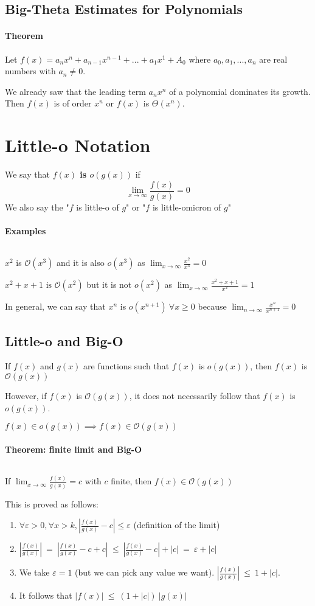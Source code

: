 \documentclass[10pt,a4paper]{book}
\begin{document}
\subsection{Big-Theta Estimates for Polynomials}
\paragraph*{Theorem}
Let $f(x)=a_nx^n+a_{n-1}x^{n-1}+...+a_1x^1+A_0$ where $a_0,a_1,...,a_n$ are real numbers with $a_n \neq 0$.\par
We already saw that the leading term $a_nx^n$ of a polynomial dominates its growth. Then $f(x)$ is of order $x^n$ or $f(x)$ is $\Theta (x^n)$.
\section{Little-o Notation}
We say that \textbf{$f(x)$ is $o (g(x))$} if \[ \lim_{x\to\infty} \frac{f(x)}{g(x)} = 0 \]
We also say the "$f$ is little-o of $g$" or "$f$ is little-omicron of $g$"
\paragraph*{Examples}
$\ $\par
$x^2$ is $\mathcal{O}(x^3)$ and it is also $o(x^3)$ as $\lim_{x\to \infty} \frac{x^2}{x^3} = 0$\par
$x^2+x+1\text{ is }\mathcal{O}(x^2)$ but it is not $o(x^2)$ as $\lim_{x\to \infty} \frac{x^2+x+1}{x^2} =1$\par 
In general, we can say that $x^n$ is $o(x^{n+1})\ \forall x \geq 0$ because $\lim_{n\to \infty} \frac{x^n}{x^{n+1}} =0$
\subsection{Little-o and Big-O}
If $f(x)$ and $g(x)$ are functions such that $f(x)$ is $o(g(x))$, then $f(x)$ is $\mathcal{O}(g(x))$\par 
However, if $f(x)$ is $\mathcal{O}(g(x))$, it does not necessarily follow that $f(x)$ is $o(g(x))$.\par 
$f(x) \in o(g(x)) \implies f(x) \in \mathcal{O}(g(x))$
\paragraph*{Theorem: finite limit and Big-O}
$\ $\par 
If $\lim_{x\to \infty} \frac{f(x)}{g(x)}=c$ with $c$ finite, then $f(x) \in \mathcal{O}(g(x))$\par 
This is proved as follows:
\begin{enumerate}
\item $\forall \varepsilon >0, \forall x>k, |\frac{f(x)}{g(x)} -c| \leqslant \varepsilon$ (definition of the limit)
\item $|\frac{f(x)}{g(x)}| \ =\ |\frac{f(x)}{g(x)} -c +c| \ \leqslant \ |\frac{f(x)}{g(x)} -c| + |c|\ =\ \varepsilon+|c|$
\item We take $\varepsilon = 1$ (but we can pick any value we want). $|\frac{f(x)}{g(x)}|\ \leqslant \ 1+|c|$.
\item It follows that $|f(x)|\ \leqslant \ (1+|c|)\ |g(x)|$
\end{enumerate}
\end{document}
